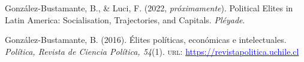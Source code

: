 





\begin{publications}

\begin{benumerate}{2}
\item{\small Gonz\'alez-Bustamante, B., \& Luci, F. (2022, {\itshape próximamente}). Political Elites in Latin America: Socialisation, Trajectories, and Capitals. {\itshape Pléyade}.}\vspace{1mm}

\item{\small Gonz\'alez-Bustamante, B. (2016). Élites políticas, económicas e intelectuales. {\itshape Pol\'itica, Revista de Ciencia Pol\'itica, 54}(1). {\scshape url}: \href{https://revistapolitica.uchile.cl/index.php/RP/issue/view/4365}{\textcolor{blue}{https://revistapolitica.uchile.cl}}} \vspace{1mm}
\end{benumerate}

\end{publications}
